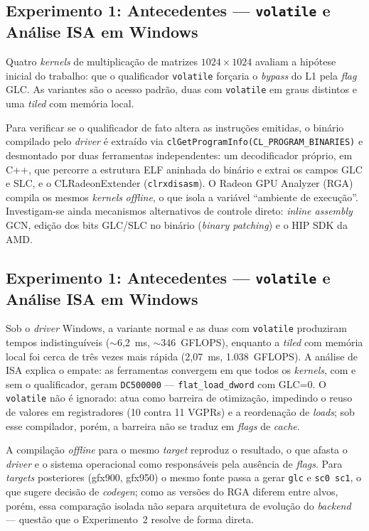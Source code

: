 
\subsection{Experimento 1: Antecedentes --- \texttt{volatile} e Análise ISA em Windows}

Quatro \textit{kernels} de multiplicação de matrizes $1024 \times 1024$ avaliam a
hipótese inicial do trabalho: que o qualificador \texttt{volatile} forçaria o
\textit{bypass} do L1 pela \textit{flag} GLC. As variantes são o acesso padrão, duas
com \texttt{volatile} em graus distintos e uma \textit{tiled} com memória local.

Para verificar se o qualificador de fato altera as instruções emitidas, o binário
compilado pelo \textit{driver} é extraído via
\texttt{clGetProgramInfo(CL\_PROGRAM\_BINARIES)} e desmontado por duas ferramentas
independentes: um decodificador próprio, em C++, que percorre a estrutura ELF
aninhada do binário e extrai os campos GLC e SLC, e o CLRadeonExtender
(\texttt{clrxdisasm}). O Radeon GPU Analyzer (RGA) compila os mesmos
\textit{kernels} \textit{offline}, o que isola a variável ``ambiente de execução''.
Investigam-se ainda mecanismos alternativos de controle direto: \textit{inline
assembly} GCN, edição dos bits GLC/SLC no binário (\textit{binary patching}) e o
HIP SDK da AMD.


\subsection{Experimento 1: Antecedentes --- \texttt{volatile} e Análise ISA em Windows}

Sob o \textit{driver} Windows, a variante normal e as duas com \texttt{volatile}
produziram tempos indistinguíveis ($\sim$6,2~ms, $\sim$346~GFLOPS), enquanto a
\textit{tiled} com memória local foi cerca de três vezes mais rápida (2,07~ms,
1.038~GFLOPS). A análise de ISA explica o empate: as ferramentas convergem em que
todos os \textit{kernels}, com e sem o qualificador, geram \texttt{DC500000} ---
\texttt{flat\_load\_dword} com GLC=0. O \texttt{volatile} não é ignorado: atua como
barreira de otimização, impedindo o reuso de valores em registradores (10 contra
11 VGPRs) e a reordenação de \textit{loads}; sob esse compilador, porém, a barreira
não se traduz em \textit{flags} de \textit{cache}.

A compilação \textit{offline} para o mesmo \textit{target} reproduz o resultado, o
que afasta o \textit{driver} e o sistema operacional como responsáveis pela ausência
de \textit{flags}. Para \textit{targets} posteriores (gfx900, gfx950) o mesmo fonte
passa a gerar \texttt{glc} e \texttt{sc0 sc1}, o que sugere decisão de
\textit{codegen}; como as versões do RGA diferem entre alvos, porém, essa comparação
isolada não separa arquitetura de evolução do \textit{backend} --- questão que o
Experimento~2 resolve de forma direta.

